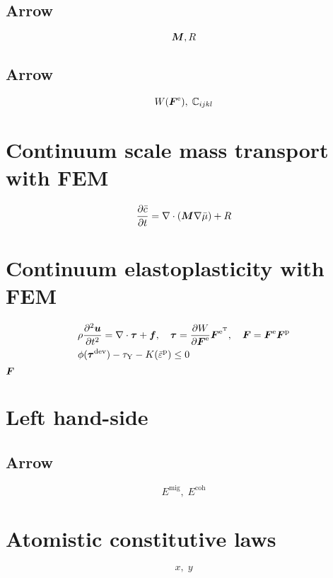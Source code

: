 \documentclass[11pt]{article}
\begin{document}
\subsection*{Arrow}
\begin{displaymath}
\mbox{\boldmath$ M$}, R
\end{displaymath}

\subsection*{Arrow}
\begin{displaymath}
W(\mbox{\boldmath$ F$}^\mathrm{e}),\;\mathbb{C}_{ijkl}
\end{displaymath}

\section*{Continuum scale mass transport with FEM}
\begin{displaymath}
\frac{\partial \bar{c}}{\partial t} = \nabla\cdot\left(\mbox{\boldmath$ M$}\nabla\bar{\mu}\right) + R
\end{displaymath}

\section*{Continuum elastoplasticity with FEM}
\begin{align*}
&\rho\frac{\partial^2\mbox{\boldmath$ u$}}{\partial t^2} = \nabla\cdot\mbox{\boldmath$\tau$} + \mbox{\boldmath$ f$},\quad \mbox{\boldmath$\tau$} = \frac{\partial W}{\partial \mbox{\boldmath$ F$}^\mathrm{e}}\mbox{\boldmath$ F$}^{\mathrm{e}^\mathrm{T}},\quad \mbox{\boldmath$ F$} = \mbox{\boldmath$ F$}^\mathrm{e}\mbox{\boldmath$ F$}^\mathrm{p}\\
&\phi(\mbox{\boldmath$\tau$}^\mathrm{dev}) - \tau_\mathrm{Y} - K(\bar{\varepsilon}^\mathrm{p}) \le 0
\end{align*}
$\mbox{\boldmath$ F$}$

\section*{Left hand-side}
\subsection*{Arrow}
\begin{displaymath}
E^\mathrm{mig},\; E^\mathrm{coh}
\end{displaymath}

\section*{Atomistic constitutive laws}
\begin{displaymath}
x,\; y
\end{displaymath}
\end{document}

